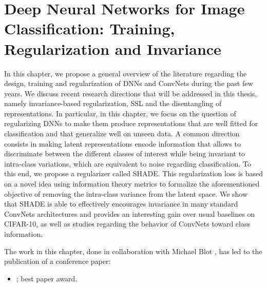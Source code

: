 \chapter{Deep Neural Networks for Image Classification: Training, Regularization and Invariance}
\label{chapter:shade}

\renewcommand{\leftmark}{\spacedlowsmallcaps{DNN\textsmaller{s} for Image Classification: Regularization and Invariance}}

\newcommand{\yi}{h}
\newcommand{\Y}{H}
\newcommand{\C}{Y}

\begin{chapabstract}
	{\em
	
    In this chapter, we propose a general overview of the literature regarding the design, training and regularization of \acp{DNN} and \acfp{ConvNet} during the past few years. We discuss recent research directions that will be addressed in this thesis, namely invariance-based regularization, \acf{SSL} and the disentangling of representations.
    In particular, in this chapter, we focus on the question of regularizing \acp{DNN} to make them produce representations that are well fitted for classification and that generalize well on unseen data. A common direction consists in making latent representations encode information that allows to discriminate between the different classes of interest while being invariant to intra-class variations, which are equivalent to noise regarding classification.
    To this end, we propose a regularizer called \acs{SHADE}. This regularization loss is based on a novel idea using information theory metrics to formalize the aforementioned objective of removing the intra-class variance from the latent space. We show that \acs{SHADE} is able to effectively encourages invariance in many standard \acp{ConvNet} architectures and provides an interesting gain over usual baselines on CIFAR-10, as well as studies regarding the behavior of \acp{ConvNet} toward class information.

	\vspace{5mm}
	The work in this chapter, done in collaboration with Michael Blot \citep{blothese}, has led to the publication of a conference paper:}
	\begin{itemize}
		\item \small {}; best paper award.
	\end{itemize}
\end{chapabstract}


